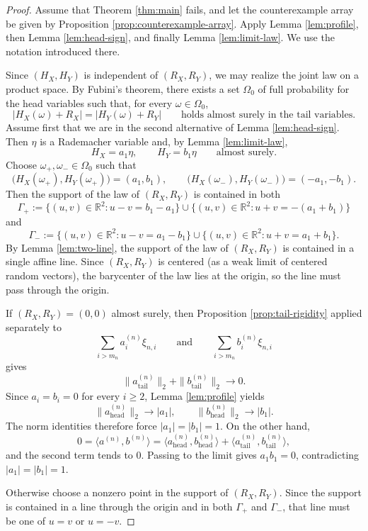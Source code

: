 \documentclass[11pt]{amsart}
\newcommand{\R}{\mathbb R}
\begin{document}
\begin{proof}
Assume that Theorem \ref{thm:main} fails, and let the counterexample array be
given by Proposition \ref{prop:counterexample-array}. Apply
Lemma \ref{lem:profile}, then Lemma \ref{lem:head-sign}, and finally
Lemma \ref{lem:limit-law}. We use the notation introduced there.

Since $(H_X,H_Y)$ is independent of $(R_X,R_Y)$, we may realize the joint law
on a product space. By Fubini's theorem, there exists a set $\Omega_0$ of full
probability for the head variables such that, for every $\omega \in \Omega_0$,
\[
|H_X(\omega)+R_X| = |H_Y(\omega)+R_Y|
\qquad
\text{holds almost surely in the tail variables.}
\]
Assume first that we are in the second alternative of Lemma
\ref{lem:head-sign}. Then $\eta$ is a Rademacher variable and, by Lemma
\ref{lem:limit-law},
\[
H_X = a_1 \eta,
\qquad
H_Y = b_1 \eta
\qquad
\text{almost surely.}
\]
Choose $\omega_+,\omega_- \in \Omega_0$ such that
\[
\bigl(H_X(\omega_+),H_Y(\omega_+)\bigr)=(a_1,b_1),
\qquad
\bigl(H_X(\omega_-),H_Y(\omega_-)\bigr)=(-a_1,-b_1).
\]
Then the support of the law of $(R_X,R_Y)$ is contained in both
\[
\Gamma_+
:=
\{(u,v)\in\R^2 : u-v=b_1-a_1\}
\cup
\{(u,v)\in\R^2 : u+v=-(a_1+b_1)\}
\]
and
\[
\Gamma_-
:=
\{(u,v)\in\R^2 : u-v=a_1-b_1\}
\cup
\{(u,v)\in\R^2 : u+v=a_1+b_1\}.
\]
By Lemma \ref{lem:two-line}, the support of the law of $(R_X,R_Y)$ is
contained in a single affine line. Since $(R_X,R_Y)$ is centered (as a weak
limit of centered random vectors), the barycenter of the law lies at the
origin, so the line must pass through the origin.

If $(R_X,R_Y)=(0,0)$ almost surely, then Proposition
\ref{prop:tail-rigidity} applied separately to
\[
\sum_{i > m_n} a_i^{(n)} \xi_{n,i}
\qquad
\text{and}
\qquad
\sum_{i > m_n} b_i^{(n)} \xi_{n,i}
\]
gives
\[
\|a^{(n)}_{\mathrm{tail}}\|_2 + \|b^{(n)}_{\mathrm{tail}}\|_2 \longrightarrow 0.
\]
Since $a_i=b_i=0$ for every $i \ge 2$, Lemma \ref{lem:profile} yields
\[
\|a^{(n)}_{\mathrm{head}}\|_2 \longrightarrow |a_1|,
\qquad
\|b^{(n)}_{\mathrm{head}}\|_2 \longrightarrow |b_1|.
\]
The norm identities therefore force $|a_1|=|b_1|=1$. On the other hand,
\[
0
=
\langle a^{(n)},b^{(n)}\rangle
=
\langle a^{(n)}_{\mathrm{head}},b^{(n)}_{\mathrm{head}}\rangle
+
\langle a^{(n)}_{\mathrm{tail}},b^{(n)}_{\mathrm{tail}}\rangle,
\]
and the second term tends to $0$. Passing to the limit gives
$a_1 b_1 = 0$, contradicting $|a_1|=|b_1|=1$.

Otherwise choose a nonzero point in the support of $(R_X,R_Y)$. Since the
support is contained in a line through the origin and in both $\Gamma_+$ and
$\Gamma_-$, that line must be one of $u=v$ or $u=-v$.


\end{proof}
\end{document}
